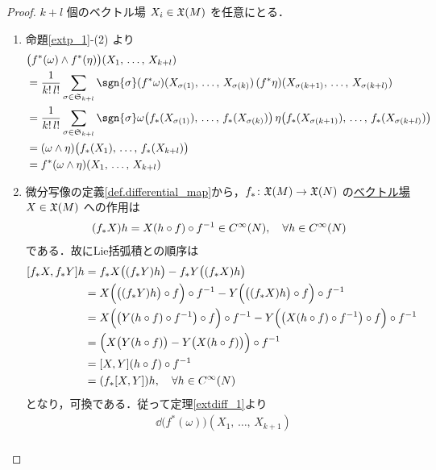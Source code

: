 \documentclass[geometry_main]{subfiles}
\begin{document}
\begin{proof} 
	$k+l$ 個のベクトル場 $X_i \in \mathfrak{X}(M)$ を任意にとる．
	\begin{enumerate} 
		\item 命題\ref{extp_1}-(2) より
		\begin{align} 
			&\bigl( f^*(\omega) \wedge f^*(\eta) \bigr)(X_1,\, \dots ,\, X_{k+l}) \\
			&= \frac{1}{k!\, l!} \sum_{\sigma \in \mathfrak{S}_{k+l}} \sgn{\sigma} (f^* \omega)(X_{\sigma(1)},\, \dots ,\, X_{\sigma(k)})\, (f^* \eta)(X_{\sigma(k+1)},\, \dots ,\, X_{\sigma(k+l)}) \\
			&= \frac{1}{k!\, l!} \sum_{\sigma \in \mathfrak{S}_{k+l}} \sgn{\sigma} \omega\bigl(f_*(X_{\sigma(1)}),\, \dots ,\, f_*(X_{\sigma(k)}) \bigr)\, \eta\bigl( f_*(X_{\sigma(k+1)}),\, \dots ,\, f_*(X_{\sigma(k+l)})\bigr) \\
			&= (\omega \wedge \eta)\bigl( f_*(X_1),\, \dots ,\, f_*(X_{k+l}) \bigr) \\
			&= f^*(\omega \wedge \eta)(X_1,\, \dots ,\, X_{k+l})
		\end{align}
		\item 微分写像の定義\eqref{def.differential_map}から，$f_* \colon \mathfrak{X}(M) \to \mathfrak{X}(N)$ の\underline{ベクトル場} $X \in \mathfrak{X}(M)$ への作用は
		\begin{align} 
			(f_* X) h = X(h \circ f) \circ f^{-1} \in C^\infty(N),\quad \forall h \in C^\infty(N)
		\end{align}
		である．故にLie括弧積との順序は
		\begin{align} 
			\comm{f_*X}{f_*Y} h &= f_* X \bigl((f_* Y) h\bigr) - f_*Y \bigl( (f_* X) h\bigr) \\
			&= X \Bigl( \bigl((f_* Y) h\bigr) \circ f \Bigr) \circ f^{-1} - Y \Bigl( \bigl((f_* X) h\bigr) \circ f \Bigr) \circ f^{-1} \\
			&= X \Bigl( \bigl(Y(h \circ f) \circ f^{-1}\bigr) \circ f \Bigr) \circ f^{-1} - Y \Bigl( \bigl(X(h \circ f) \circ f^{-1}\bigr) \circ f \Bigr) \circ f^{-1} \\
			&= \Bigl( X \bigl( Y(h \circ f)\bigr) - Y \bigl( X(h \circ f) \bigr) \Bigr) \circ f^{-1} \\
			&= \comm{X}{Y}(h \circ f) \circ f^{-1} \\
			&= (f_*\comm{X}{Y})h,\quad \forall h \in \cinftyf{N}
		\end{align}
		となり，可換である．従って定理\ref{extdiff_1}より
		\begin{align} 
			&\dd{\bigl( f^*(\omega) \bigr)} (X_1,\, \dots ,\, X_{k+1}) \\

\end{align}
\end{enumerate}
\end{proof}
\end{document}
